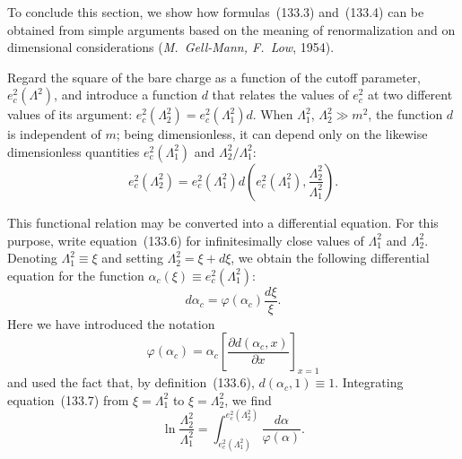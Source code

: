 To conclude this section, we show how formulas~(133.3) and~(133.4) can be obtained from simple arguments based on the meaning of renormalization and on dimensional considerations (\emph{M.~Gell-Mann, F.~Low}, 1954).

Regard the square of the bare charge as a function of the cutoff parameter, $e_c^2(\Lambda^2)$, and introduce a function $d$ that relates the values of $e_c^2$ at two different values of its argument: $e_c^2(\Lambda_2^2)=e_c^2(\Lambda_1^2)d$. When $\Lambda_1^2$, $\Lambda_2^2\gg m^2$, the function $d$ is independent of $m$; being dimensionless, it can
depend only on the likewise dimensionless quantities $e_c^2(\Lambda_1^2)$ and $\Lambda_2^2/\Lambda_1^2$:
\begin{equation}
e_c^2(\Lambda_2^2)=e_c^2(\Lambda_1^2)d\left(e_c^2(\Lambda_1^2),\frac{\Lambda_2^2}{\Lambda_1^2}\right).
\tag{133.6}
\end{equation}

This functional relation may be converted into a differential equation. For this purpose, write equation~(133.6) for infinitesimally close values of $\Lambda_1^2$ and $\Lambda_2^2$. Denoting $\Lambda_1^2\equiv\xi$ and setting $\Lambda_2^2=\xi+d\xi$, we obtain the following differential equation for the function $\alpha_c(\xi)\equiv e_c^2(\Lambda_1^2)$:
\begin{equation}
d\alpha_c=\varphi(\alpha_c)\frac{d\xi}{\xi}.
\tag{133.7}
\end{equation}
Here we have introduced the notation
\begin{equation}
\varphi(\alpha_c)=\alpha_c\left[\frac{\partial d(\alpha_c,x)}{\partial x}\right]_{x=1}
\tag{133.8}
\end{equation}
and used the fact that, by definition~(133.6), $d(\alpha_c,1)\equiv1$. Integrating equation~(133.7) from $\xi=\Lambda_1^2$ to $\xi=\Lambda_2^2$, we find
\begin{equation}
\ln\frac{\Lambda_2^2}{\Lambda_1^2}=\int_{e_c^2(\Lambda_1^2)}^{e_c^2(\Lambda_2^2)}\frac{d\alpha}{\varphi(\alpha)}.
\tag{133.9}
\end{equation}

